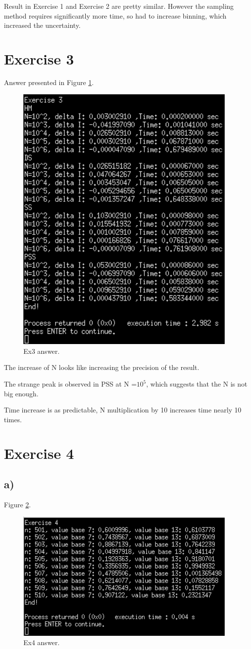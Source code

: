 \documentclass{article}
\begin{document}
Result in Exercise 1 and Exercise 2 are pretty similar. However the sampling method requires significantly more time, so had to increase binning, which increased the uncertainty.

\clearpage

\section{Exercise 3}
Answer presented in Figure \ref{fig:ex3_answer}.
\begin{figure}[!hbt]
	\centering
	\includegraphics[width=4.3in]{ex3_answer}
	\caption{Ex3 answer.}
	\label{fig:ex3_answer}
\end{figure}

The increase of N looks like increasing the precision of the result.

The strange peak is observed in PSS at N =$10^5$, which suggests that the N is not big enough.

Time increase is as predictable, N multiplication by 10 increases time nearly 10 times.

\clearpage
\section{Exercise 4}
\subsection{a)}
Figure \ref{fig:ex4a_answer}.
\begin{figure}[!hbt]
	\centering
	\includegraphics[width=4.3in]{ex4a_answer}
	\caption{Ex4 answer.}
	\label{fig:ex4a_answer}
\end{figure}
\end{document}
